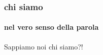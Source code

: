 \begin{frame}
    \frametitle{chi siamo}
    \framesubtitle{nel vero senso della parola}
    \addtocounter{nframe}{1}

    \begin{block}{Sappiamo}
        noi chi siamo?!
    \end{block}
    
\end{frame}